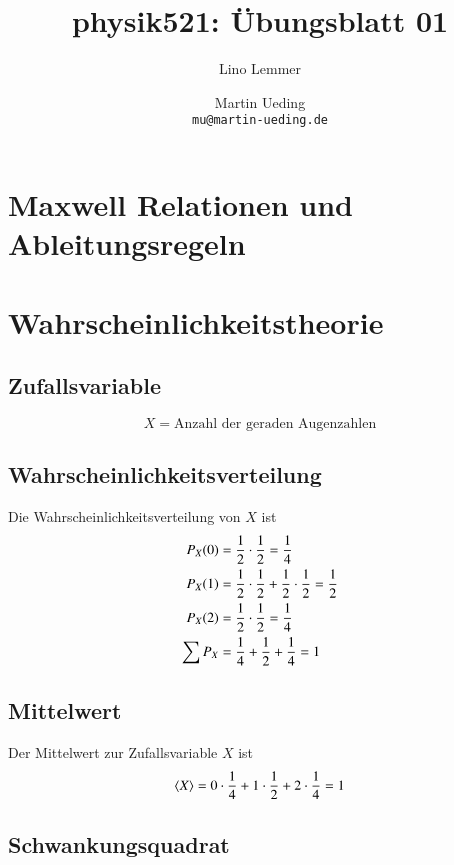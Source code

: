 

\setcounter{section}{1}
\renewcommand\thesection{H\,1.\arabic{section}}
\renewcommand\thesubsection{\thesection.\alph{subsection}}

\title{physik521: Übungsblatt 01}
\author{Lino Lemmer \and Martin Ueding \\ \small{\texttt{mu@martin-ueding.de}}}


\maketitle
\section{Maxwell Relationen und Ableitungsregeln}


\section{Wahrscheinlichkeitstheorie}

\subsection{Zufallsvariable}

\[
    X = \text{Anzahl der geraden Augenzahlen}
\]

\subsection{Wahrscheinlichkeitsverteilung}

Die Wahrscheinlichkeitsverteilung von $X$ ist
\begin{align*}
    P_X(0) &= \frac 12\cdot\frac 12 = \frac 14\\
    P_X(1) &= \frac 12\cdot\frac 12 + \frac 12\cdot\frac 12 = \frac 12\\
    P_X(2) &= \frac 12\cdot\frac 12 = \frac 14\\
    \sum P_X &= \frac 14 + \frac 12 + \frac 14 = 1
\end{align*}

\subsection{Mittelwert}

Der Mittelwert zur Zufallsvariable $X$ ist
\[
    \left\langle X\right\rangle = 0\cdot\frac14 + 1\cdot\frac 12 + 2\cdot\frac14 = 1
\]

\subsection{Schwankungsquadrat}

